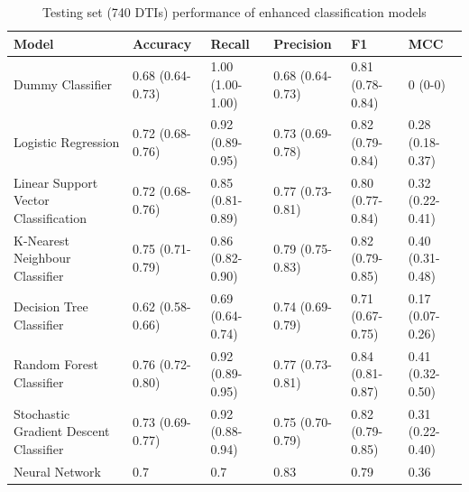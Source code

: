 \begin{table}
    \tabcolsep=0.08cm
    \begin{tabular}{llllll}
    \toprule
                                     Model &        Accuracy  &           Recall &        Precision &               F1 &              MCC \\
    \midrule
                          Dummy Classifier & 0.68 (0.64-0.73) & 1.00 (1.00-1.00) & 0.68 (0.64-0.73) & 0.81 (0.78-0.84) &          0 (0-0) \\
                       Logistic Regression & 0.72 (0.68-0.76) & 0.92 (0.89-0.95) & 0.73 (0.69-0.78) & 0.82 (0.79-0.84) & 0.28 (0.18-0.37) \\
      Linear Support Vector Classification & 0.72 (0.68-0.76) & 0.85 (0.81-0.89) & 0.77 (0.73-0.81) & 0.80 (0.77-0.84) & 0.32 (0.22-0.41) \\
            K-Nearest Neighbour Classifier & 0.75 (0.71-0.79) & 0.86 (0.82-0.90) & 0.79 (0.75-0.83) & 0.82 (0.79-0.85) & 0.40 (0.31-0.48) \\
                  Decision Tree Classifier & 0.62 (0.58-0.66) & 0.69 (0.64-0.74) & 0.74 (0.69-0.79) & 0.71 (0.67-0.75) & 0.17 (0.07-0.26) \\
                  Random Forest Classifier & 0.76 (0.72-0.80) & 0.92 (0.89-0.95) & 0.77 (0.73-0.81) & 0.84 (0.81-0.87) & 0.41 (0.32-0.50) \\
    Stochastic Gradient Descent Classifier & 0.73 (0.69-0.77) & 0.92 (0.88-0.94) & 0.75 (0.70-0.79) & 0.82 (0.79-0.85) & 0.31 (0.22-0.40) \\
                            Neural Network &              0.7 &              0.7 &             0.83 &             0.79 &             0.36 \\
    \bottomrule
    \end{tabular}
    \caption{Testing set (740 DTIs) performance of enhanced classification models}
    \label{tbl:enhanced_classification}
\end{table}

